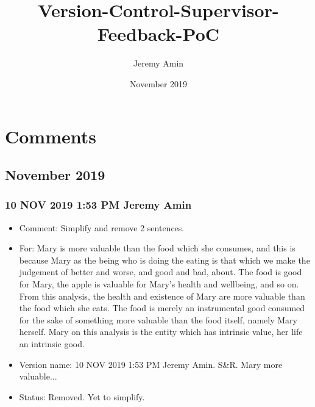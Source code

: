 \documentclass{article}
\title{Version-Control-Supervisor-Feedback-PoC}
\author{Jeremy Amin}
\date{November 2019}
\begin{document}
\maketitle
\tableofcontents

\pagebreak

\section{Comments}

\subsection{November 2019}

\subsubsection{10 NOV 2019 1:53 PM Jeremy Amin}

\begin{itemize}
    \item Comment: Simplify and remove 2 sentences.
    \item For: Mary is more valuable than the food which she consumes, and this is because Mary as the being who is doing the eating is that which we make the judgement of better and worse, and good and bad, about. The food is good for Mary, the apple is valuable for Mary’s health and wellbeing, and so on. From this analysis, the health and existence of Mary are more valuable than the food which she eats. The food is merely an instrumental good consumed for the sake of something more valuable than the food itself, namely Mary herself. Mary on this analysis is the entity which has intrinsic value, her life an intrinsic good.
    \item Version name: 10 NOV 2019 1:53 PM Jeremy Amin. S\&R. Mary more valuable...
    \item Status: Removed. Yet to simplify.
\end{itemize}
\end{document}
